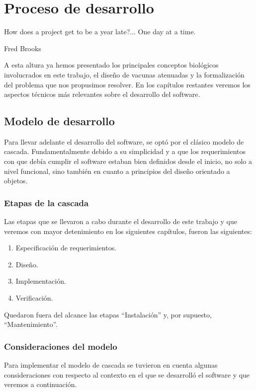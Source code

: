 \chapter{Proceso de desarrollo}
\epigraph{How does a project get to be a year late?... One day at a time.}%
{Fred Brooks}

A esta altura ya hemos presentado los principales conceptos biol\'ogicos
involucrados en este trabajo, el dise\~no de vacunas atenuadas y la
formalizaci\'on del problema que nos propusimos resolver. En los cap\'itulos
restantes veremos los aspectos t\'ecnicos m\'as relevantes sobre el desarrollo
del software.

\section{Modelo de desarrollo}

Para llevar adelante el desarrollo del software, se opt\'o por el cl\'asico
modelo de cascada. Fundamentalmente debido a su simplicidad y a que los
requerimientos con que deb\'ia cumplir el software estaban bien definidos desde
el inicio, no solo a nivel funcional, sino tambi\'en en cuanto a principios del
dise\~no orientado a objetos.

\subsection{Etapas de la cascada}

Las etapas que se llevaron a cabo durante el desarrollo de este trabajo y que
veremos con mayor detenimiento en los siguientes cap\'itulos, fueron las
siguientes:
\begin{enumerate}
 \item Especificaci\'on de requerimientos.
 \item Dise\~no.
 \item Implementaci\'on.
 \item Verificaci\'on.
\end{enumerate}

Quedaron fuera del alcance las etapas ``Instalaci\'on'' y, por supuesto,
``Mantenimiento''.

\subsection{Consideraciones del modelo}

Para implementar el modelo de cascada se tuvieron en cuenta algunas
consideraciones con respecto al contexto en el que se desarroll\'o el software
y que veremos a continuaci\'on. 

